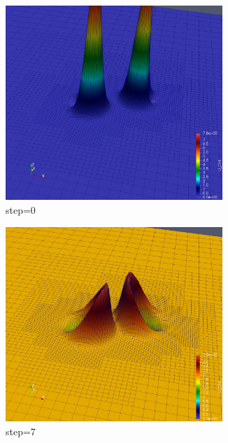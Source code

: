 \documentclass[landscape]{a0poster}
\begin{document}
\begin{textblock}{32}
\begin{textblock}{14}
	\begin{figure}
		\begin{subfigure}{0.33\textwidth}
			\includegraphics[width=0.9\textwidth]{figs/nlsmB0.png}
			\caption{step=0}			
		\end{subfigure}
		\begin{subfigure}{0.33\textwidth}
			\includegraphics[width=0.9\textwidth]{figs/nlsmB7.png}
			\caption{step=7}			
		\end{subfigure}
		\begin{subfigure}{0.33\textwidth}

\end{subfigure}
\end{figure}
\end{textblock}
\end{textblock}
\end{document}

